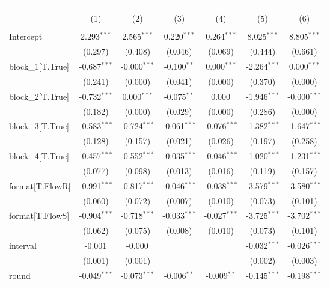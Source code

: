 \begin{table}[!htbp] \centering
\begin{tabular}{@{\extracolsep{5pt}}lcccccc}
\\[-1.8ex]\hline
\hline \\[-1.8ex]
\\[-1.8ex] & (1) & (2) & (3) & (4) & (5) & (6) \\
\hline \\[-1.8ex]
 Intercept & 2.293$^{***}$ & 2.565$^{***}$ & 0.220$^{***}$ & 0.264$^{***}$ & 8.025$^{***}$ & 8.805$^{***}$ \\
& (0.297) & (0.408) & (0.046) & (0.069) & (0.444) & (0.661) \\
 block_1[T.True] & -0.687$^{***}$ & -0.000$^{***}$ & -0.100$^{**}$ & 0.000$^{***}$ & -2.264$^{***}$ & 0.000$^{***}$ \\
& (0.241) & (0.000) & (0.041) & (0.000) & (0.370) & (0.000) \\
 block_2[T.True] & -0.732$^{***}$ & 0.000$^{***}$ & -0.075$^{**}$ & 0.000$^{}$ & -1.946$^{***}$ & -0.000$^{***}$ \\
& (0.182) & (0.000) & (0.029) & (0.000) & (0.286) & (0.000) \\
 block_3[T.True] & -0.583$^{***}$ & -0.724$^{***}$ & -0.061$^{***}$ & -0.076$^{***}$ & -1.382$^{***}$ & -1.647$^{***}$ \\
& (0.128) & (0.157) & (0.021) & (0.026) & (0.197) & (0.258) \\
 block_4[T.True] & -0.457$^{***}$ & -0.552$^{***}$ & -0.035$^{***}$ & -0.046$^{***}$ & -1.020$^{***}$ & -1.231$^{***}$ \\
& (0.077) & (0.098) & (0.013) & (0.016) & (0.119) & (0.157) \\
 format[T.FlowR] & -0.991$^{***}$ & -0.817$^{***}$ & -0.046$^{***}$ & -0.038$^{***}$ & -3.579$^{***}$ & -3.580$^{***}$ \\
& (0.060) & (0.072) & (0.007) & (0.010) & (0.073) & (0.101) \\
 format[T.FlowS] & -0.904$^{***}$ & -0.718$^{***}$ & -0.033$^{***}$ & -0.027$^{***}$ & -3.725$^{***}$ & -3.702$^{***}$ \\
& (0.062) & (0.075) & (0.008) & (0.010) & (0.073) & (0.101) \\
 interval & -0.001$^{}$ & -0.000$^{}$ & & & -0.032$^{***}$ & -0.026$^{***}$ \\
& (0.001) & (0.001) & & & (0.002) & (0.003) \\
 round & -0.049$^{***}$ & -0.073$^{***}$ & -0.006$^{**}$ & -0.009$^{**}$ & -0.145$^{***}$ & -0.198$^{***}$ \\

\end{tabular}
\end{table}
